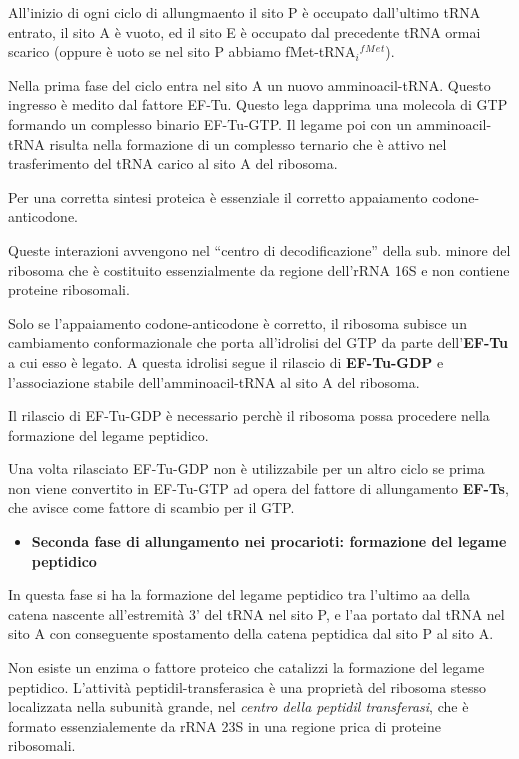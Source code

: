 \documentclass[11pt]{book}
\begin{document}
All'inizio di ogni ciclo di allungmaento il sito P è occupato
dall'ultimo tRNA entrato, il sito A è vuoto, ed il sito E è occupato dal
precedente tRNA ormai scarico (oppure è uoto se nel sito P abbiamo
fMet-tRNA\(_i\)\(^f\)\(^M\)\(^e\)\(^t\)).

Nella prima fase del ciclo entra nel sito A un nuovo amminoacil-tRNA.
Questo ingresso è medito dal fattore EF-Tu. Questo lega dapprima una
molecola di GTP formando un complesso binario EF-Tu-GTP. Il legame poi
con un amminoacil-tRNA risulta nella formazione di un complesso ternario
che è attivo nel trasferimento del tRNA carico al sito A del ribosoma.

Per una corretta sintesi proteica è essenziale il corretto appaiamento
codone-anticodone.

Queste interazioni avvengono nel ``centro di decodificazione'' della
sub. minore del ribosoma che è costituito essenzialmente da regione
dell'rRNA 16S e non contiene proteine ribosomali.

Solo se l'appaiamento codone-anticodone è corretto, il ribosoma subisce
un cambiamento conformazionale che porta all'idrolisi del GTP da parte
dell'\textbf{EF-Tu} a cui esso è legato. A questa idrolisi segue il
rilascio di \textbf{EF-Tu-GDP} e l'associazione stabile
dell'amminoacil-tRNA al sito A del ribosoma.

Il rilascio di EF-Tu-GDP è necessario perchè il ribosoma possa procedere
nella formazione del legame peptidico.

Una volta rilasciato EF-Tu-GDP non è utilizzabile per un altro ciclo se
prima non viene convertito in EF-Tu-GTP ad opera del fattore di
allungamento \textbf{EF-Ts}, che avisce come fattore di scambio per il
GTP.

\begin{itemize}
\itemsep1pt\parskip0pt
\item
  \textbf{Seconda fase di allungamento nei procarioti: formazione del
  legame peptidico}
\end{itemize}

In questa fase si ha la formazione del legame peptidico tra l'ultimo aa
della catena nascente all'estremità 3' del tRNA nel sito P, e l'aa
portato dal tRNA nel sito A con conseguente spostamento della catena
peptidica dal sito P al sito A.

Non esiste un enzima o fattore proteico che catalizzi la formazione del
legame peptidico. L'attività peptidil-transferasica è una proprietà del
ribosoma stesso localizzata nella subunità grande, nel \emph{centro
della peptidil transferasi}, che è formato essenzialemente da rRNA 23S
in una regione prica di proteine ribosomali.
\end{document}
